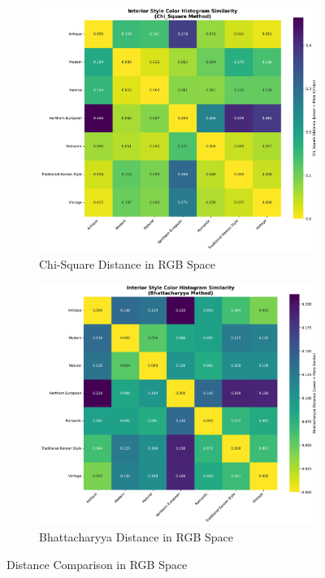 \documentclass[11pt]{article}
\begin{document}
\begin{figure}[htbp]
    \centering
    \begin{subfigure}[b]{0.45\textwidth}
        \centering
        \includegraphics[width=\textwidth]{figures/rgb_chi_square_distance.pdf}
        \caption{Chi-Square Distance in RGB Space}
        \label{fig:rgb_chi_square_distance}
    \end{subfigure}
    \begin{subfigure}[b]{0.45\textwidth}
        \centering
        \includegraphics[width=\textwidth]{figures/rgb_bhattacharyya_distance.pdf}
        \caption{Bhattacharyya Distance in RGB Space}
        \label{fig:rgb_bhattacharyya_distance}
    \end{subfigure}
    \caption{Distance Comparison in RGB Space}
    \label{fig:rgb_distance_comparison}
\end{figure}
\end{document}
